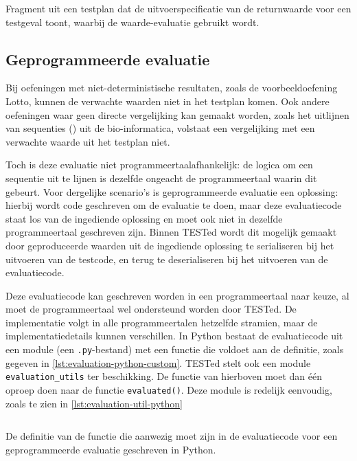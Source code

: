 \begin{listing}
    \inputminted{json}{code/testplan-value.json}
    \caption{Fragment uit een testplan dat de uitvoerspecificatie van de returnwaarde voor een testgeval toont, waarbij de waarde-evaluatie gebruikt wordt.}
    \label{lst:testplan-value}
\end{listing}

\subsection{Geprogrammeerde evaluatie}\label{subsec:geprogrammeerde-evaluatie}

Bij oefeningen met niet-deterministische resultaten, zoals de voorbeeldoefening Lotto, kunnen de verwachte waarden niet in het testplan komen.
Ook andere oefeningen waar geen directe vergelijking kan gemaakt worden, zoals het uitlijnen van sequenties () uit de bio-informatica, volstaat een vergelijking met een verwachte waarde uit het testplan niet.

Toch is deze evaluatie niet programmeertaalafhankelijk: de logica om een sequentie uit te lijnen is dezelfde ongeacht de programmeertaal waarin dit gebeurt.
Voor dergelijke scenario's is geprogrammeerde evaluatie een oplossing: hierbij wordt code geschreven om de evaluatie te doen, maar deze evaluatiecode staat los van de ingediende oplossing en moet ook niet in dezelfde programmeertaal geschreven zijn.
Binnen TESTed wordt dit mogelijk gemaakt door geproduceerde waarden uit de ingediende oplossing te serialiseren bij het uitvoeren van de testcode, en terug te deserialiseren bij het uitvoeren van de evaluatiecode.

Deze evaluatiecode kan geschreven worden in een programmeertaal naar keuze, al moet de programmeertaal wel ondersteund worden door TESTed.
De implementatie volgt in alle programmeertalen hetzelfde stramien, maar de implementatiedetails kunnen verschillen.
In Python bestaat de evaluatiecode uit een module (een \texttt{.py}-bestand) met een functie die voldoet aan de definitie, zoals gegeven in \cref{lst:evaluation-python-custom}.
TESTed stelt ook een module \texttt{evaluation\_utils} ter beschikking.
De functie van hierboven moet dan één oproep doen naar de functie \texttt{evaluated()}.
Deze module is redelijk eenvoudig, zoals te zien in \cref{lst:evaluation-util-python}

\begin{listing}
    \inputminted{python}{code/custom_signature.py}
    \caption{De definitie van de functie die aanwezig moet zijn in de evaluatiecode voor een geprogrammeerde evaluatie geschreven in Python.}
    \label{lst:evaluation-python-custom}
\end{listing}

